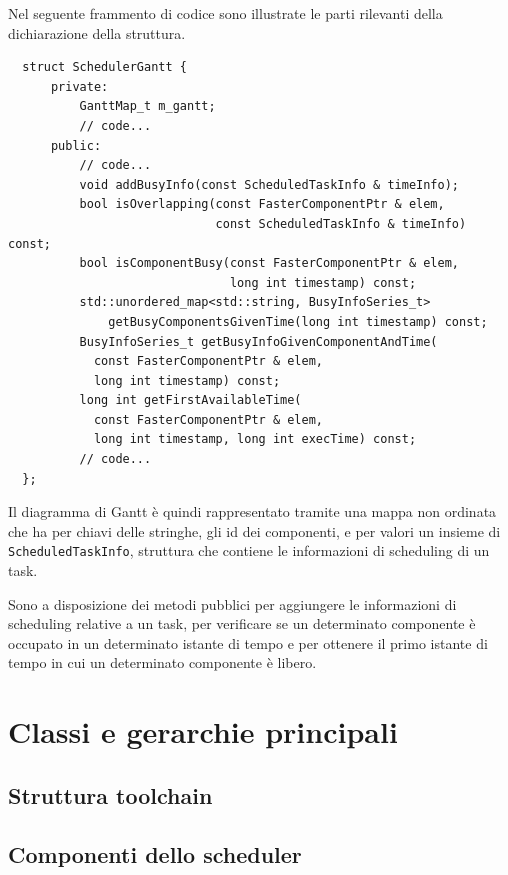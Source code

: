 Nel seguente frammento di codice sono illustrate le parti rilevanti della 
dichiarazione della struttura.
\newline
\begin{verbatim}
  struct SchedulerGantt {
      private:
          GanttMap_t m_gantt;
          // code...
      public:
          // code...
          void addBusyInfo(const ScheduledTaskInfo & timeInfo);
          bool isOverlapping(const FasterComponentPtr & elem,
                             const ScheduledTaskInfo & timeInfo) const;
          bool isComponentBusy(const FasterComponentPtr & elem,
                               long int timestamp) const;
          std::unordered_map<std::string, BusyInfoSeries_t> 
              getBusyComponentsGivenTime(long int timestamp) const;
          BusyInfoSeries_t getBusyInfoGivenComponentAndTime(
            const FasterComponentPtr & elem,
            long int timestamp) const;
          long int getFirstAvailableTime(
            const FasterComponentPtr & elem, 
            long int timestamp, long int execTime) const;
          // code...
  };
\end{verbatim}
Il diagramma di Gantt è quindi rappresentato tramite una mappa non ordinata 
che ha per chiavi delle stringhe, gli id dei componenti, e per valori un 
insieme di \verb+ScheduledTaskInfo+, struttura che contiene le informazioni di 
scheduling di un task.

Sono a disposizione dei metodi pubblici per aggiungere le informazioni di 
scheduling relative a un task, per verificare se un determinato componente è 
occupato in un determinato istante di tempo e per ottenere il primo istante di 
tempo in cui un determinato componente è libero.


\section{Classi e gerarchie principali}
\label{sec:classiGerarchie}


\subsection{Struttura toolchain}
\label{subsec:strutturaToolchain}


\subsection{Componenti dello scheduler}
\label{subsec:componentiScheduler}

